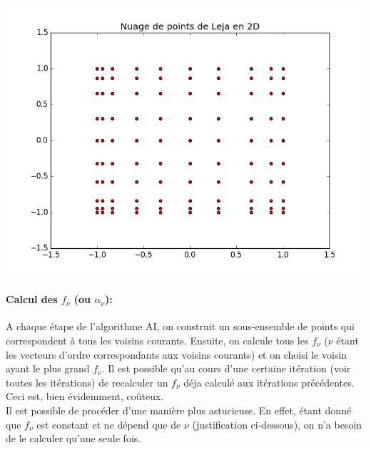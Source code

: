 \begin{center}
\includegraphics[height= 9 cm,width = \linewidth]{images/leja_sequence.png}
\label{figure:lejagrid}
\end{center}

\paragraph{Calcul des $f_{\nu}$ (ou $\alpha_{\nu}$):\\}
\hspace{0.5cm} A chaque étape de l'algorithme AI, on construit un sous-ensemble de points qui correspondent à tous les voisins courants. Ensuite, on calcule tous les $f_{\nu}$ ($\nu$ étant les vecteurs d'ordre correspondants aux voisins courants) et on choisi le voisin ayant le plus grand $f_{\nu}$. Il est possible qu'au cours d'une certaine itération (voir toutes les itérations) de recalculer un $f_{\nu}$ déja calculé aux itérations précédentes. Ceci est, bien évidemment, coûteux. \\
Il est possible de procéder d'une manière plus astucieuse. En effet, étant donné que $f_{\nu}$ est constant et ne dépend que de $\nu$ (justification ci-dessous), on n'a besoin de le calculer qu'une seule fois.


